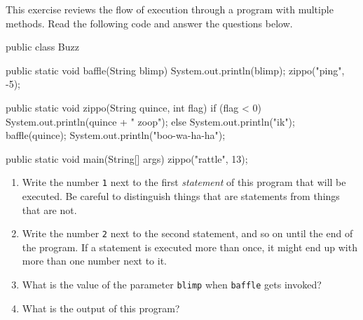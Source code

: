 \documentclass[12pt]{book}
\begin{document}
\begin{exercise}
This exercise reviews the flow of execution through a program with multiple methods.
Read the following code and answer the questions below.

\begin{code}
public class Buzz {

    public static void baffle(String blimp) {
        System.out.println(blimp);
        zippo("ping", -5);
    }

    public static void zippo(String quince, int flag) {
        if (flag < 0) {
            System.out.println(quince + " zoop");
        } else {
            System.out.println("ik");
            baffle(quince);
            System.out.println("boo-wa-ha-ha");
        }
    }

    public static void main(String[] args) {
        zippo("rattle", 13);
    }
}
\end{code}

\begin{enumerate}

\item Write the number {\tt 1} next to the first {\em statement} of this program that will be executed.
Be careful to distinguish things that are statements from things that are not.

\item Write the number {\tt 2} next to the second statement, and so on until the end of the program.
If a statement is executed more than once, it might end up with more than one number next to it.

\item What is the value of the parameter {\tt blimp} when {\tt baffle} gets invoked?

\item What is the output of this program?

\end{enumerate}
\end{exercise}
\end{document}
